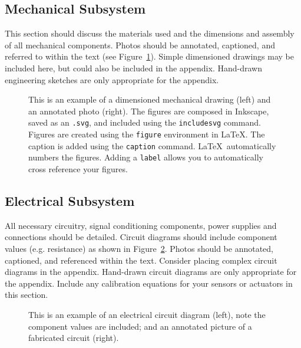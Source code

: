 \documentclass{wsecapstone}
\begin{document}
\subsection{Mechanical Subsystem}
This section should discuss the materials used and the dimensions and assembly of all mechanical components. Photos should be annotated, captioned, and referred to within the text (see Figure~\ref{f1}). Simple dimensioned drawings may be included here, but could also be included in the appendix. Hand-drawn engineering sketches are only appropriate for the appendix.
\begin{figure}
\begin{center}

\end{center}
\caption{This is an example of a dimensioned mechanical drawing (left) and an annotated photo (right).  The figures are composed in Inkscape, saved as an \lstinline{.svg}, and included using the \lstinline{includesvg} command. Figures are created using the \lstinline{figure} environment in \LaTeX. The caption is added using the \lstinline{caption} command. \LaTeX\ automatically numbers the figures. Adding a \lstinline{label} allows you to automatically cross reference your figures.}
\label{f1}
\end{figure}

\subsection{Electrical Subsystem}
All necessary circuitry, signal conditioning components, power supplies and connections should be detailed.  Circuit diagrams should include component values (e.g. resistance) as shown in Figure~\ref{f2}. Photos should be annotated, captioned, and referenced within the text. Consider placing complex circuit diagrams in the appendix. Hand-drawn circuit diagrams are only appropriate for the appendix.   Include any calibration equations for your sensors or actuators in this section. 
\begin{figure}
\begin{center}

\end{center}
\caption{This is an example of an electrical circuit diagram (left), note the component values are included; and an annotated picture of a fabricated circuit (right).}
\label{f2}
\end{figure}
\end{document}
